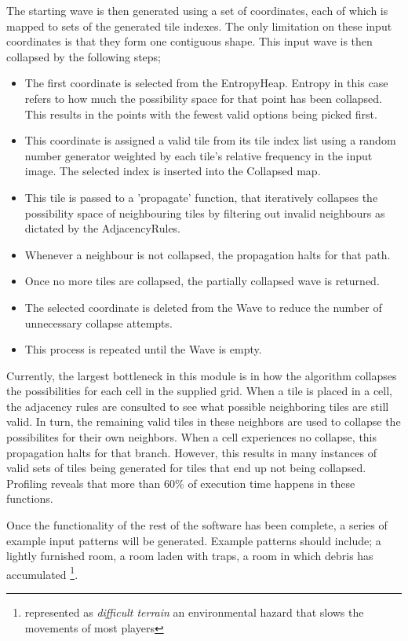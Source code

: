 \documentclass{article}
\begin{document}
The starting wave is then generated using a set of coordinates, each of which is mapped to sets of the generated tile indexes. The only limitation on these input coordinates is that they form one contiguous shape. This input wave is then collapsed by the following steps;
\begin{itemize}
    \item The first coordinate is selected from the EntropyHeap. Entropy in this case refers to how much the possibility space for that point has been collapsed. This results in the points with the fewest valid options being picked first.
    \item This coordinate is assigned a valid tile from its tile index list using a random number generator weighted by each tile's relative frequency in the input image. The selected index is inserted into the Collapsed map.
    \item This tile is passed to a 'propagate' function, that iteratively collapses the possibility space of neighbouring tiles by filtering out invalid neighbours as dictated by the AdjacencyRules.
    \item Whenever a neighbour is not collapsed, the propagation halts for that path.
    \item Once no more tiles are collapsed, the partially collapsed wave is returned.
    \item The selected coordinate is deleted from the Wave to reduce the number of unnecessary collapse attempts.
    \item This process is repeated until the Wave is empty.
\end{itemize}



Currently, the largest bottleneck in this module is in how the algorithm collapses the possibilities for each cell in the supplied grid. When a tile is placed in a cell, the adjacency rules are consulted to see what possible neighboring tiles are still valid. In turn, the remaining valid tiles in these neighbors are used to collapse the possibilites for their own neighbors. When a cell experiences no collapse, this propagation halts for that branch. However, this results in many instances of valid sets of tiles being generated for tiles that end up not being collapsed. Profiling reveals that more than 60\% of execution time happens in these functions. 



Once the functionality of the rest of the software has been complete, a series of example input patterns will be generated. Example patterns should include; a lightly furnished room, a room laden with traps, a room in which debris has accumulated \footnote{represented as \textit{difficult terrain} an environmental hazard that slows the movements of most players}. 
\end{document}
